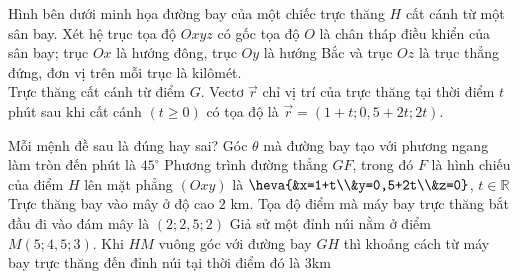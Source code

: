 \begin{ex}%
	Hình bên dưới minh họa đường bay của một chiếc trực thăng $H$ cất cánh từ một sân bay. Xét hệ trục tọa độ $Oxyz$ có gốc tọa độ $O$ là chân tháp điều khiển của sân bay; trục $Ox$ là hướng đông, trục $Oy$ là hướng Bắc và trục $Oz$ là trục thẳng đứng, đơn vị trên mỗi trục là kilômét.\\
	Trực thăng cất cánh từ điểm $G$. Vectơ $\vec{r}$ chỉ vị trí của trực thăng tại thời điểm $t$ phút sau khi cất cánh $(t\ge 0)$ có tọa độ là $\vec{r}=(1+t; 0,5+2t; 2t)$.
	\begin{center}
	\end{center}
	Mỗi mệnh đề sau là đúng hay sai?
	\choiceTF
	{Góc $\theta$ mà đường bay tạo với phương ngang làm tròn đến phút là $45^\circ$}
	{\True Phương trình đường thẳng $GF$, trong đó $F$ là hình chiếu của điểm $H$ lên mặt phẳng $(Oxy)$ là $\heva{&x=1+t\\&y=0,5+2t\\&z=0}$, $t\in \mathbb{R}$}
	{\True Trực thăng bay vào mây ở độ cao $2$ km. Tọa độ điểm mà máy bay trực thăng bắt đầu đi vào đám mây là $(2;2{,}5;2)$}
	{Giả sử một đỉnh núi nằm ở điểm $M(5;4,5;3)$. Khi $HM$ vuông góc với đường bay $GH$ thì khoảng cách từ máy bay trực thăng đến đỉnh núi tại thời điểm đó là $3$km}
\end{ex}
